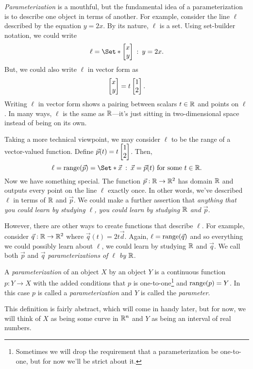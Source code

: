 \emph{Parameterization} is a mouthful, but the
fundamental idea of a parameterization is to describe one object in
terms of another.  For example, consider the line $\ell$ described
by the equation $y=2x$.  By its nature, $\ell$ is a set.
Using set-builder notation, we could write
\[
	\ell = \Set*{\mat{x\\y}\given y=2x}.
\]
But, we could also write $\ell$ in vector form as 
\[
	\mat{x\\y}=t\mat{1\\2}.
\]
Writing $\ell$ in vector form shows a pairing between scalars $t\in \mathbb{R}$
and points on $\ell$.  In many ways, $\ell$ is the same as $\mathbb{R}$---it's
just sitting in two-dimensional space instead of being on its own.

Taking a more technical viewpoint, we may consider $\ell$ to be the range of 
a vector-valued function.  Define $\vec p(t) = t\mat{1\\2}$.  Then,
\[
	\ell = \Range(\vec p) = \Set*{\vec x\given \vec x=\vec p(t)\text{ for some }t\in\R}.
\]
Now we have something special.  The function $\vec p:\mathbb{R}\to\mathbb{R}^2$ has domain $\mathbb{R}$ and outputs
every point on the line $\ell$ exactly once.  In other words, we've described
$\ell$ in terms of $\mathbb{R}$ and $\vec p$.  We could make a further assertion
that \emph{anything that you could learn by studying $\ell$, you could learn
by studying $\mathbb{R}$ and $\vec p$}.

However, there are other ways to create functions that describe $\ell$.
For example, consider $\vec q:\mathbb{R}\to\mathbb{R}^2$ where $\vec q(t)=2t\vec d$.  Again,
$\ell = \operatorname{range}(\vec q)$ and so everything we could possibly learn about
$\ell$, we could learn by studying $\mathbb{R}$ and $\vec q$.
We call both $\vec p$ and $\vec q$ \emph{parameterizations of $\ell$ by $\mathbb{R}$}.

\begin{definition}[Parameterization]
	A \emph{parameterization} of an object $X$ by an object $Y$ is a continuous
	function $p:Y\to X$ with the added conditions that $p$ is one-to-one\footnote{
	Sometimes we will drop the requirement that a parameterization be one-to-one,
	but for now we'll be strict about it.}
	and $\operatorname{range}(p)= Y$.  In this case $p$ is called a \emph{parameterization} and $Y$ is
	called the \emph{parameter}.
\end{definition}

This definition is fairly abstract, which will come in handy later, but for
now, we will think of $X$ as being some curve in $\mathbb{R}^n$ and $Y$ as being an
interval of real numbers.


